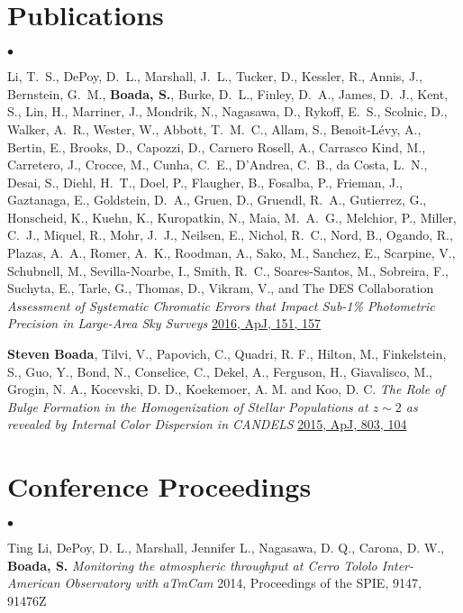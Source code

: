 \documentclass[margin,line, 11pt]{res}
\newenvironment{list2}{
  \begin{list}{$\bullet$}{%
      \setlength{\itemsep}{0in}
      \setlength{\parsep}{0in} \setlength{\parskip}{0in}
      \setlength{\topsep}{0in} \setlength{\partopsep}{0in}
      \setlength{\leftmargin}{0.2in}}}{\end{list}}
\begin{document}
\begin{resume}
\section{\sc Publications}
\begin{list2}
\item Li, T.~S., DePoy, D.~L., Marshall, J.~L., Tucker, D., Kessler, R., Annis, J.,
Bernstein, G.~M., \textbf{Boada, S.}, Burke, D.~L., Finley, D.~A., James, D.~J., Kent, S.,
Lin, H., Marriner, J., Mondrik, N., Nagasawa, D., Rykoff, E.~S., Scolnic, D., Walker, A.~R.,
Wester, W., Abbott, T.~M.~C., Allam, S., Benoit-L\'evy, A., Bertin, E., Brooks, D., Capozzi,
D., Carnero Rosell, A., Carrasco Kind, M., Carretero, J., Crocce, M., Cunha, C.~E.,
D'Andrea, C.~B., da Costa, L.~N., Desai, S., Diehl, H.~T., Doel, P., Flaugher, B., Fosalba,
P., Frieman, J., Gaztanaga, E., Goldstein, D.~A., Gruen, D., Gruendl, R.~A., Gutierrez, G.,
Honscheid, K., Kuehn, K., Kuropatkin, N., Maia, M.~A.~G., Melchior, P., Miller, C.~J.,
Miquel, R., Mohr, J.~J., Neilsen, E., Nichol, R.~C., Nord, B., Ogando, R., Plazas, A.~A.,
Romer, A.~K., Roodman, A., Sako, M., Sanchez, E., Scarpine, V., Schubnell, M.,
Sevilla-Noarbe, I., Smith, R.~C., Soares-Santos, M., Sobreira, F., Suchyta, E., Tarle, G.,
Thomas, D., Vikram, V., and The DES Collaboration \emph{Assessment of Systematic Chromatic
Errors that Impact Sub-1\% Photometric Precision in Large-Area Sky Surveys} \href{http://adsabs.harvard.edu/abs/2016AJ....151..157L}{2016, ApJ, 151, 157}

\item \textbf{Steven Boada}, Tilvi, V., Papovich, C., Quadri, R. F., Hilton, M., Finkelstein, S., Guo, Y., Bond, N., Conselice, C., Dekel, A., Ferguson, H., Giavalisco, M., Grogin, N. A., Kocevski, D. D., Koekemoer, A. M. and Koo, D. C. \emph{The Role of Bulge Formation in the Homogenization of Stellar Populations at $z\sim2$ as revealed by Internal Color Dispersion in CANDELS} \href{http://adsabs.harvard.edu/abs/2015ApJ...803..104B}{2015, ApJ, 803, 104}
\end{list2}

\section{\sc Conference Proceedings}
\begin{list2}
\item Ting Li, DePoy, D. L., Marshall, Jennifer L., Nagasawa, D. Q., Carona, D. W., {\bf Boada, S.} \emph{Monitoring the atmospheric throughput at Cerro Tololo Inter-American Observatory with aTmCam} 2014, Proceedings of the SPIE, 9147, 91476Z
\end{list2}


\end{resume}
\end{document}
